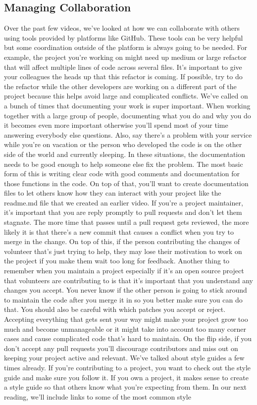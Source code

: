 	\subsection{Managing Collaboration}
	
	Over the past few videos, we've looked at how we can collaborate with others using tools provided by platforms like GitHub. These tools can be very helpful but some coordination outside of the platform is always going to be needed. For example, the project you're working on might need up medium or large refactor that will affect multiple lines of code across several files. It's important to give your colleagues the heads up that this refactor is coming. If possible, try to do the refactor while the other developers are working on a different part of the project because this helps avoid large and complicated conflicts. We've called on a bunch of times that documenting your work is super important. When working together with a large group of people, documenting what you do and why you do it becomes even more important otherwise you'll spend most of your time answering everybody else questions. Also, say there's a problem with your service while you're on vacation or the person who developed the code is on the other side of the world and currently sleeping. In these situations, the documentation needs to be good enough to help someone else fix the problem. The most basic form of this is writing clear code with good comments and documentation for those functions in the code. On top of that, you'll want to create documentation files to let others know how they can interact with your project like the readme.md file that we created an earlier video. If you're a project maintainer, it's important that you are reply promptly to pull requests and don't let them stagnate. The more time that passes until a pull request gets reviewed, the more likely it is that there's a new commit that causes a conflict when you try to merge in the change. On top of this, if the person contributing the changes of volunteer that's just trying to help, they may lose their motivation to work on the project if you make them wait too long for feedback. Another thing to remember when you maintain a project especially if it's an open source project that volunteers are contributing to is that it's important that you understand any changes you accept. You never know if the other person is going to stick around to maintain the code after you merge it in so you better make sure you can do that. You should also be careful with which patches you accept or reject. Accepting everything that gets sent your way might make your project grow too much and become unmanageable or it might take into account too many corner cases and cause complicated code that's hard to maintain. On the flip side, if you don't accept any pull requests you'll discourage contributors and miss out on keeping your project active and relevant. We've talked about style guides a few times already. If you're contributing to a project, you want to check out the style guide and make sure you follow it. If you own a project, it makes sense to create a style guide so that others know what you're expecting from them. In our next reading, we'll include links to some of the most common style 